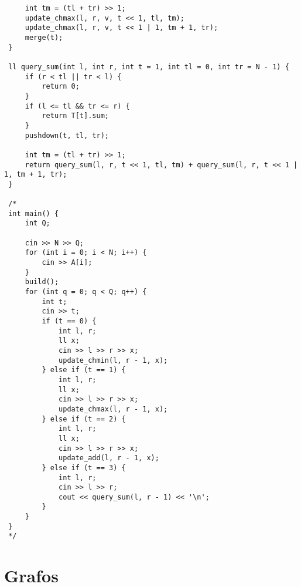 \documentclass[11pt, a4paper, twoside]{article}
\begin{document}
\begin{lstlisting}
     int tm = (tl + tr) >> 1;
     update_chmax(l, r, v, t << 1, tl, tm);
     update_chmax(l, r, v, t << 1 | 1, tm + 1, tr);
     merge(t);
 }
 
 ll query_sum(int l, int r, int t = 1, int tl = 0, int tr = N - 1) {
     if (r < tl || tr < l) {
         return 0;
     }
     if (l <= tl && tr <= r) {
         return T[t].sum;
     }
     pushdown(t, tl, tr);
 
     int tm = (tl + tr) >> 1;
     return query_sum(l, r, t << 1, tl, tm) + query_sum(l, r, t << 1 | 1, tm + 1, tr);
 }
 
 /*
 int main() {
     int Q;
 
     cin >> N >> Q;
     for (int i = 0; i < N; i++) {
         cin >> A[i];
     }
     build();
     for (int q = 0; q < Q; q++) {
         int t;
         cin >> t;
         if (t == 0) {
             int l, r;
             ll x;
             cin >> l >> r >> x;
             update_chmin(l, r - 1, x);
         } else if (t == 1) {
             int l, r;
             ll x;
             cin >> l >> r >> x;
             update_chmax(l, r - 1, x);
         } else if (t == 2) {
             int l, r;
             ll x;
             cin >> l >> r >> x;
             update_add(l, r - 1, x);
         } else if (t == 3) {
             int l, r;
             cin >> l >> r;
             cout << query_sum(l, r - 1) << '\n';
         }
     }
 }
 */
\end{lstlisting}

\clearpage


%
%

\section{Grafos}
\end{document}
